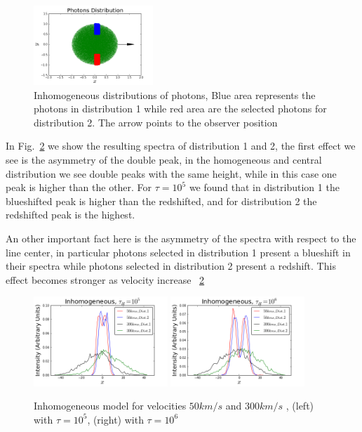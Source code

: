 \documentclass[usenatbib]{mn2e}
\begin{document}
\begin{figure}
  \includegraphics[width=0.40\textwidth]{Distribution.png}
  \caption{Inhomogeneous distributions of 
 photons, Blue area represents the photons in distribution 1 while red
 area are the selected photons for distribution 2. The arrow points to
 the observer position\label{figure:distributions}}  
\end{figure}

In Fig.~\ref{figure:inhomogeneous} we show the resulting spectra of 
distribution 1 and 2, the first effect we see is the asymmetry of the
double peak, in the homogeneous and central distribution we see double
peaks with the same height, while in this case one peak is higher than 
the other. For $\tau=10^{5}$ we found that in distribution 1 the blueshifted
peak is higher than the redshifted, and for distribution 2 the redshifted
peak is the highest.

An other important fact here is the asymmetry of the spectra with respect 
to the line center, in particular photons selected in distribution 1 
present a blueshift in their spectra while photons selected in distribution 
2 present a redshift. This effect becomes stronger as velocity increase 
~\ref{figure:inhomogeneous}
 
\begin{figure}
  \includegraphics[width=0.45\textwidth]{InomogeneousModelt5.png}
  \includegraphics[width=0.45\textwidth]{InomogeneousModelt6.png}
 \caption{Inhomogeneous model for velocities $50km/s$ and $300km/s$ ,
   (left) with $\tau=10^5$, (right) with
   $\tau=10^6$\label{figure:inhomogeneous}}  
\end{figure}
 
\end{document}

